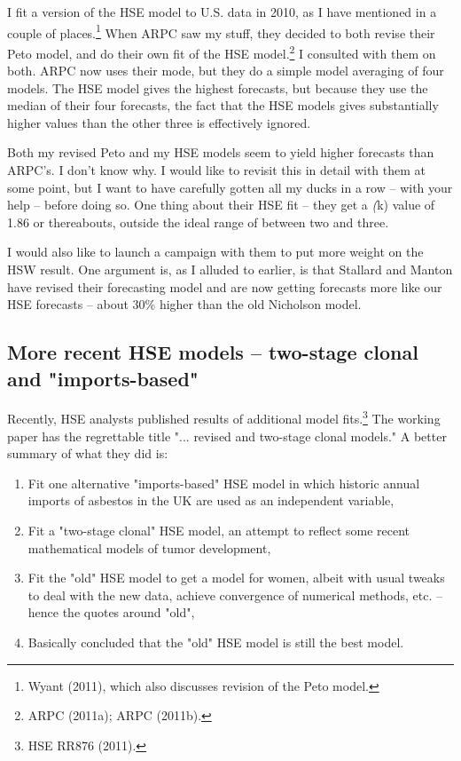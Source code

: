 \documentclass{article}\usepackage{graphicx, color}
\begin{document}
I fit a version of the HSE model to U.S. data in 2010, as I have mentioned in a couple of places.\footnote{ Wyant (2011), which also discusses revision of the Peto model.}  When ARPC saw my stuff, they decided to both revise their Peto model, and do their own fit of the HSE model.\footnote{ ARPC (2011a); ARPC (2011b).}  I consulted with them on both.  ARPC now uses their mode, but they do a simple model averaging of four models.  The HSE model gives the highest forecasts, but because they use the median of their four forecasts, the fact that the HSE models gives substantially higher values than the other three is effectively ignored.

Both my revised Peto and my HSE models seem to yield higher forecasts than ARPC's.  I don't know why.  I would like to revisit this in detail with them at some point, but I want to have carefully gotten all my ducks in a row -- with your help -- before doing so.  One thing about their HSE fit -- they get a \emph(k) value of 1.86 or thereabouts, outside the ideal range of between two and three.

I would also like to launch a campaign with them to put more weight on the HSW result.  One argument is, as I alluded to earlier, is that Stallard and Manton have revised their forecasting model and are now getting forecasts more like our HSE forecasts -- about 30\% higher than the old Nicholson model.

\subsection{More recent HSE models -- two-stage clonal and "imports-based"}

Recently, HSE analysts published results of additional model fits.\footnote{HSE RR876 (2011).}  The working paper has the regrettable title "... revised and two-stage clonal models."  A better summary of what they did is:

\begin{enumerate}
  \item Fit one alternative "imports-based" HSE model in which historic annual imports of asbestos in the UK are used as an independent variable,
  \item Fit a "two-stage clonal" HSE model, an attempt to reflect some recent mathematical models of tumor development,
  \item Fit the "old" HSE model to get a model for women, albeit with usual tweaks to deal with the new data, achieve convergence of numerical methods, etc. -- hence the quotes around "old",
  \item Basically concluded that the "old" HSE model is still the best model.
\end{enumerate}
\end{document}
